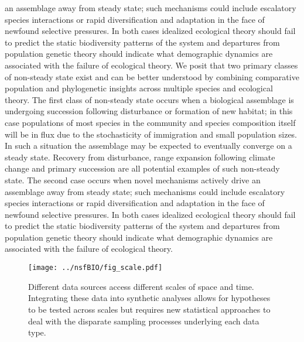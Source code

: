 \documentclass[11pt]{article}
\begin{document}
an assemblage away from steady state; such mechanisms could include escalatory species interactions or rapid diversification and adaptation in the face of newfound selective pressures. In both cases idealized ecological theory should fail to predict the static biodiversity patterns of the system and departures from population genetic theory should indicate what demographic dynamics are associated with the failure of ecological theory. We posit that two primary classes of non-steady state exist and can be better understood by combining comparative population and phylogenetic insights across multiple species and ecological theory. The first class of non-steady state occurs when a biological assemblage is undergoing succession following disturbance or formation of new habitat; in this case populations of most species in the community and species composition itself will be in flux due to the stochasticity of immigration and small population sizes. In such a situation the assemblage may be expected to eventually converge on a steady state. Recovery from disturbance, range expansion following climate change and primary succession are all potential examples of such non-steady state. The second case occurs when novel mechanisms actively drive an assemblage away from steady state; such mechanisms could include escalatory species interactions or rapid diversification and adaptation in the face of newfound selective pressures. In both cases idealized ecological theory should fail to predict the static biodiversity patterns of the system and departures from population genetic theory should indicate what demographic dynamics are associated with the failure of ecological theory.


\begin{wrapfigure}[]{r}{0.4\textwidth}
  \label{fig:scale} 
  \vspace{-30pt}
  \begin{center}
    \texttt{[image: ../nsfBIO/fig\_scale.pdf]}
  \end{center}
  \vspace{-20pt}
  \caption{\footnotesize Different data sources access different
    scales of space and time. Integrating these data into synthetic
    analyses allows for hypotheses to be tested across scales but
    requires new statistical approaches to deal with the disparate
    sampling processes underlying each data type.}
  \vspace{-20pt}
\end{wrapfigure}



\vbox{}
\end{document}
